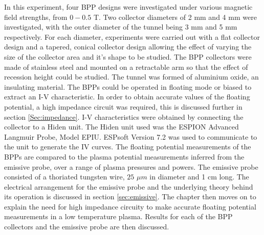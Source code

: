 In this experiment, four BPP designs were investigated under various magnetic field strengths, from $0 - 0.5$ T. Two collector diameters of 2 mm and 4 mm  were investigated, with the outer diameter of the tunnel being 3 mm and 5 mm respectively. For each diameter, experiments were carried out with a flat collector design and a tapered, conical collector design allowing the effect of varying the size of the collector area and it's shape to be studied. The BPP collectors were made of stainless steel and mounted on a retractable arm so that the effect of recession height could be studied. The tunnel was formed of aluminium oxide, an insulating material. The BPPs could be operated in floating mode or biased to extract an I-V characteristic. In order to obtain accurate values of the floating potential, a high impedance circuit was required, this is discussed further in section \ref{Sec:impedance}. I-V characteristics were obtained by connecting the collector to a Hiden unit. The Hiden unit used was the ESPION Advanced Langmuir Probe, Model EPIU. ESPsoft Version 7.2 was used to communicate to the unit to generate the IV curves. The floating potential measurements of the BPPs are compared to the plasma potential measurements inferred from the emissive probe, over a range of plasma pressures and powers.  The emissive probe consisted of a thoriated tungsten wire, $25$ $\mu m$ in diameter and 1 cm long. The electrical arrangement for the emissive probe and the underlying theory behind its operation is discussed in section \ref{sec:emissive}.  The chapter then moves on to explain the need for high impedance circuity to make accurate floating potential measurements in a low temperature plasma. Results for each of the BPP collectors and the emissive probe are then discussed.   





